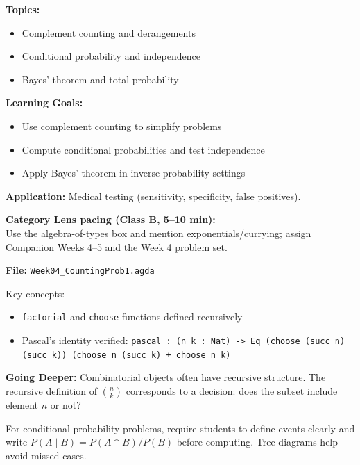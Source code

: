 \documentclass[11pt]{article}
\begin{document}
\begin{classbbox}
\textbf{Topics:}
\begin{itemize}
    \item Complement counting and derangements
    \item Conditional probability and independence
    \item Bayes' theorem and total probability
\end{itemize}

\textbf{Learning Goals:}
\begin{itemize}
    \item Use complement counting to simplify problems
    \item Compute conditional probabilities and test independence
    \item Apply Bayes' theorem in inverse-probability settings
\end{itemize}

\textbf{Application:} Medical testing (sensitivity, specificity, false positives).
\end{classbbox}

\textbf{Category Lens pacing (Class B, 5--10 min):}\\
Use the algebra-of-types box and mention exponentials/currying; assign Companion Weeks 4--5 and the Week 4 problem set.

\begin{agdabox}
\textbf{File:} \texttt{Week04\_CountingProb1.agda}

Key concepts:
\begin{itemize}
    \item \texttt{factorial} and \texttt{choose} functions defined recursively
    \item Pascal's identity verified: \texttt{pascal : (n k : Nat) -> Eq (choose (succ n) (succ k)) (choose n (succ k) + choose n k)}
\end{itemize}

\textbf{Going Deeper:} Combinatorial objects often have recursive structure. The recursive definition of $\binom{n}{k}$ corresponds to a decision: does the subset include element $n$ or not?
\end{agdabox}

\begin{tipbox}
For conditional probability problems, require students to define events clearly and write
$P(A \mid B) = P(A \cap B)/P(B)$ before computing. Tree diagrams help avoid missed cases.
\end{tipbox}
\end{document}
